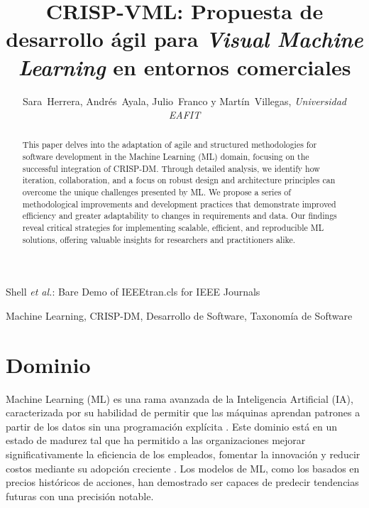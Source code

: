 \documentclass[journal]{IEEEtran}
\begin{document}

\title{CRISP-VML: Propuesta de desarrollo ágil para \textit{Visual Machine Learning} en entornos comerciales}

\author{Sara~Herrera, Andrés~Ayala, Julio~Franco y Martín~Villegas, \textit{Universidad EAFIT}}

%
{Shell \MakeLowercase{\textit{et al.}}: Bare Demo of IEEEtran.cls for IEEE Journals}

\maketitle

\begin{abstract}
This paper delves into the adaptation of agile and structured methodologies for software development in the Machine Learning (ML) domain, focusing on the successful integration of CRISP-DM. Through detailed analysis, we identify how iteration, collaboration, and a focus on robust design and architecture principles can overcome the unique challenges presented by ML. We propose a series of methodological improvements and development practices that demonstrate improved efficiency and greater adaptability to changes in requirements and data. Our findings reveal critical strategies for implementing scalable, efficient, and reproducible ML solutions, offering valuable insights for researchers and practitioners alike.
\end{abstract}

\begin{IEEEkeywords}
Machine Learning, CRISP-DM, Desarrollo de Software, Taxonomía de Software
\end{IEEEkeywords}


\IEEEpeerreviewmaketitle


\section{Dominio}
 Machine Learning (ML) es una rama avanzada de la Inteligencia Artificial (IA), caracterizada por su habilidad de permitir que las máquinas aprendan patrones a partir de los datos sin una programación explícita \cite{Russell2021-eg}. Este dominio está en un estado de madurez tal que ha permitido a las organizaciones mejorar significativamente la eficiencia de los empleados, fomentar la innovación y reducir costos mediante su adopción creciente \cite{ibmWhatMachine}. Los modelos de ML, como los basados en precios históricos de acciones, han demostrado ser capaces de predecir tendencias futuras con una precisión notable.\\
\end{document}
